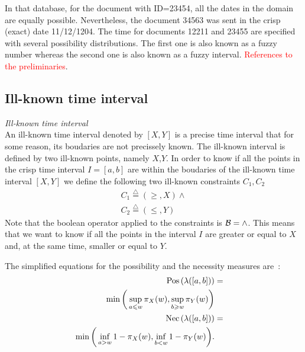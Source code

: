 In that database, for the document with ID=23454, all the dates in the domain are equally possible. Nevertheless, the document 34563 was sent in the crisp (exact) date 11/12/1204. The time for documents 12211 and 23455 are specified with several possibility distributions. The first one is also known as a fuzzy number whereas the second one is also known as a fuzzy interval.
\textcolor{red}{References to the preliminaries}.
 
 
 


\subsection{\label{subsec:ill-known-interval}Ill-known time interval}


\begin{definition}
\emph{Ill-known time interval}\\
An ill-known time interval denoted by $\left[X, Y\right]$ is a precise time interval that for some reason, its boudaries are not precissely known. The ill-known interval is defined by two ill-known points, namely $X$,$Y$.
In order to know if all the points in the crisp time interval $I=\left[a, b\right]$ are within the boudaries of the ill-known time interval $\left[X, Y\right]$ we define the following two ill-known constraints $C_{1}, C_{2}$ 
\begin{eqnarray}
C_1\stackrel{\triangle}{=}\left(\geq,X\right) \wedge \\
C_2\stackrel{\triangle}{=}\left(\leq,Y\right)
\end{eqnarray}
Note that the boolean operator applied to the constraints is $\operatorname*{\mathcal{B}}=\wedge$.
This means that we want to know if all the points in the interval $I$ are greater or equal to $X$ and, at the same time, smaller or equal to $Y$.
\end{definition}

The simplified equations for the possibility and the necessity measures are~\cite{Pons2011}:
\begin{eqnarray}
\label{eq:interval-pos}
\operatorname{Pos}\left(\lambda([a,b])\right)&=&\\
\nonumber
\min\bigg(\sup_{a\leqslant w}\pi_{X}(w),\sup_{b\geqslant w}\pi_{Y}(w)\bigg)\\
\label{eq:interval-nec}
\operatorname{Nec}\left(\lambda([a,b])\right)&=&\\
\nonumber
\min\bigg(\inf_{a>w}1-\pi_{X}(w),\inf_{b<w}1-\pi_{Y}(w)\bigg).
\end{eqnarray}





